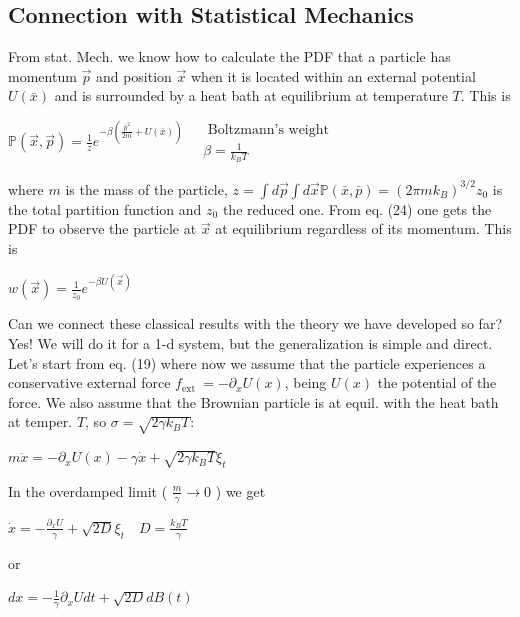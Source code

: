 \subsection*{Connection with Statistical Mechanics}
From stat. Mech. we know how to calculate the PDF that a particle has momentum
$\vec{p}$ and position $\vec{x}$ when it is located within an external potential
$U(\bar{x})$ and is surrounded by a heat bath at equilibrium at temperature $T$.
This is
\begin{DispWithArrows}[displaystyle, format=ll]
  $\mathbb{P}(\vec{x}, \vec{p})=\frac{1}{z} e^{-\beta\left(\frac{\bar{p}^{2}}{2 m}+U(\bar{x})\right)} \quad \begin{aligned} \text { Boltzmann's weight } \\ \beta=\frac{1}{k_{B} T}\end{aligned}$
\end{DispWithArrows}
where $m$ is the mass of the particle,
$z=\int d \vec{p} \int d \vec{x} \mathbb{P}(\bar{x}, \bar{p})=\left(2 \pi m k_{B}\right)^{3 / 2} z_{0}$
is the total partition function and $z_{0}$ the reduced one. From eq. (24) one
gets the PDF to observe the particle at $\vec{x}$ at equilibrium regardless of
its momentum. This is
\begin{DispWithArrows}[displaystyle, format=c]
  $w(\vec{x})=\frac{1}{z_{0}} e^{-\beta U(\vec{x})}$
\end{DispWithArrows}
Can we connect these classical results with the theory we have developed so far?
Yes! We will do it for a 1-d system, but the generalization is simple and
direct. Let's start from eq. (19) where now we assume that the particle
experiences a conservative external force $f_{\text {ext }}=-\partial_{x} U(x)$,
being $U(x)$ the potential of the force. We also assume that the Brownian
particle is at equil. with the heat bath at temper. $T$, so
$\sigma=\sqrt{2 \gamma k_{B} T}$:
\begin{DispWithArrows}[displaystyle, format=c]
  $m \ddot{x}=-\partial_{x} U(x)-\gamma \dot{x}+\sqrt{2 \gamma k_{B} T} \xi_{t}$
\end{DispWithArrows}
In the overdamped limit ( $\frac{m}{\gamma} \rightarrow 0$ ) we get
\begin{DispWithArrows}[displaystyle, format=c]
  $\dot{x}=-\frac{\partial_{x} U}{\gamma}+\sqrt{2 D} \xi_{t} \quad D=\frac{k_{B} T}{\gamma}$
\end{DispWithArrows}
or
\begin{DispWithArrows}[displaystyle, format=c]
  $d x=-\frac{1}{\gamma} \partial_{x} U d t+\sqrt{2 D} d B(t)$
\end{DispWithArrows}
